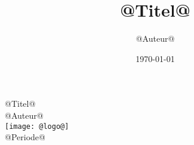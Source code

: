 \documentclass[twocolumn,a4paper,10pt]{report}
\title{@Titel@}
\author{@Auteur@}
\date{\today{}}
\begin{document}
\begin{titlepage}
  \begin{center}
    \huge @Titel@ \\
    \vspace{1in}
    \large @Auteur@ \\
    \vspace{2in}
    \texttt{[image: @logo@]} \\
    \vspace{1in}
    \large @Periode@ \\
  \end{center}
\end{titlepage}

\begin{landscape}
  \begin{center}
  \end{center}
\end{landscape}
\newpage
\end{document}
